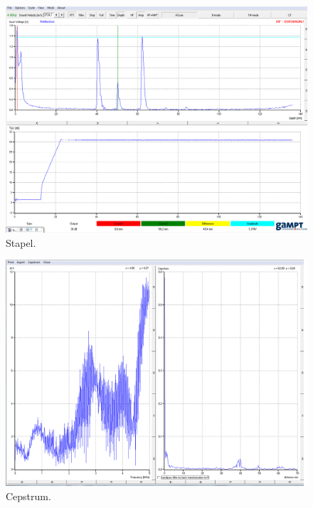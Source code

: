 \begin{figure}
    \centering
    \includegraphics[width=\textheight,height=\textwidth,angle=90]{stapel1.png}
    \caption{Stapel.}
    \label{fig:stapel}
\end{figure}

\begin{figure}
    \centering
    \includegraphics[width=\textheight,height=\textwidth,angle=90]{cepstrum1.png}
    \caption{Cepstrum.}
    \label{fig:cepstrum}
\end{figure}
 